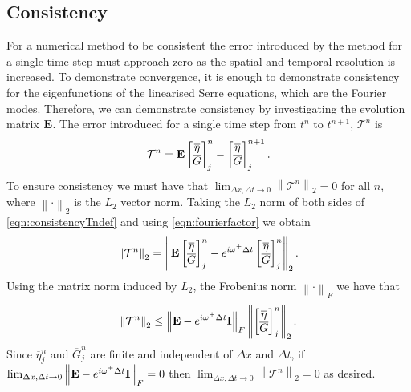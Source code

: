 \subsection{Consistency}
For a numerical method to be consistent the error introduced by the method for a single time step must approach zero as the spatial and temporal resolution is increased. To demonstrate convergence, it is enough to demonstrate consistency for the eigenfunctions of the linearised Serre equations, which are the Fourier modes. Therefore, we can demonstrate consistency by investigating the evolution matrix $\mathbf{E}$. The error introduced for a single time step from $t^n$ to $t^{n+1}$, $\mathcal{T}^n$ is
\begin{equation}
\mathcal{T}^n =  \mathbf{E}\begin{bmatrix}
\overline{\eta} \\ \overline{G}
\end{bmatrix}^{n}_j -  \begin{bmatrix}
\overline{\eta} \\ \overline{G}
\end{bmatrix}^{n+1}_j.
\label{eqn:consistencyTndef}
\end{equation}
To ensure consistency we must have that $ \lim_{\Delta x,\Delta t \rightarrow 0}\left \| \mathcal{T}^n \right \|_2 = 0 $ for all $n$, where $\left \|  \cdot\right\|_2$ is the $L_2$ vector norm. Taking the $L_2$ norm of both sides of \eqref{eqn:consistencyTndef} and using \eqref{eqn:fourierfactor}  we obtain
\begin{equation*}
\left \|\mathcal{T}^n \right \|_2 = \left \|  \mathbf{E}\begin{bmatrix}
\overline{\eta} \\ \overline{G}
\end{bmatrix}^{n}_j -  e^{i \omega^\pm \Delta t} \begin{bmatrix}
\overline{\eta} \\ \overline{G}
\end{bmatrix}^{n}_j \right \|_2.
\end{equation*}
Using the matrix norm induced by $L_2$, the Frobenius norm $\left \|  \cdot\right\|_F$ we have that
\begin{equation*}
\left \|\mathcal{T}^n \right \|_2  \le \left \| \mathbf{E} -  e^{i \omega^\pm \Delta t}\mathbf{I} \right \|_F \left \| \begin{bmatrix}
\overline{\eta} \\ \overline{G}
\end{bmatrix}^{n}_j\right \|_2.
\end{equation*}
Since $\overline{\eta}^n_j$ and  $\overline{G}^n_j$ are finite and independent of $\Delta x$ and $\Delta t$, if $ \lim_{\Delta x,\Delta t \rightarrow 0} \left\| \mathbf{E} -  e^{i \omega^\pm \Delta t}\mathbf{I} \right\|_F = 0 $ then $ \lim_{\Delta x,\Delta t \rightarrow 0}\left \| \mathcal{T}^n \right \|_2 = 0 $ as desired.

